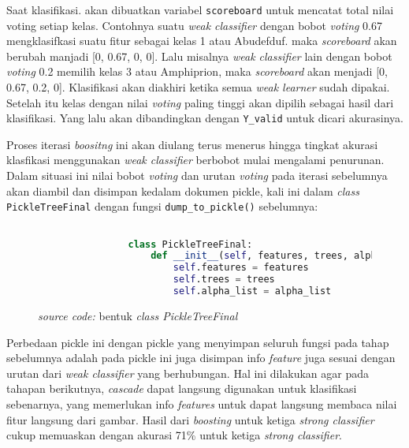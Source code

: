 		Saat klasifikasi. akan dibuatkan variabel \texttt{scoreboard} untuk mencatat total nilai voting 
		setiap kelas. Contohnya suatu \emph{weak classifier} dengan bobot \textit{voting} 0.67 
		mengklasifkasi suatu fitur sebagai kelas 1 atau Abudefduf. maka \emph{scoreboard} akan 
		berubah manjadi [0, 0.67, 0, 0]. Lalu misalnya \emph{weak classifier} lain dengan bobot 
		\textit{voting} 0.2 memilih kelas 3 atau Amphiprion, maka \emph{scoreboard} akan menjadi 
		[0, 0.67, 0.2, 0]. Klasifikasi akan diakhiri ketika semua \emph{weak learner} sudah 
		dipakai. Setelah itu kelas dengan nilai \textit{voting} paling tinggi akan dipilih sebagai 
		hasil dari klasifikasi. Yang lalu akan dibandingkan dengan \texttt{Y\_valid} untuk dicari akurasinya.

		Proses iterasi \emph{boositng} ini akan diulang terus menerus hingga tingkat akurasi klasfikasi 
		menggunakan \emph{weak classifier} berbobot mulai mengalami penurunan. Dalam situasi ini 
		nilai bobot \textit{voting} dan urutan \textit{voting} pada iterasi sebelumnya akan diambil dan disimpan 
		kedalam dokumen pickle, kali ini dalam \textit{class} \texttt{PickleTreeFinal} dengan fungsi 
		\texttt{dump\_to\_pickle()} sebelumnya:

		\begin{figure}[H]
			\begin{lstlisting}[language=Python, basicstyle=\tiny]

				class PickleTreeFinal:
					def __init__(self, features, trees, alpha_list):
						self.features = features
						self.trees = trees
						self.alpha_list = alpha_list

			\end{lstlisting}
			\caption{\emph{source code:} bentuk \textit{class PickleTreeFinal}}
			\label{code: PickleTreeFinal class}
		\end{figure}

		Perbedaan pickle ini dengan pickle yang menyimpan seluruh fungsi pada tahap sebelumnya 
		adalah pada pickle ini juga disimpan info \emph{feature} juga sesuai dengan urutan dari 
		\emph{weak classifier} yang berhubungan. Hal ini dilakukan agar pada tahapan berikutnya, 
		\emph{cascade} dapat langsung digunakan untuk klasifikasi sebenarnya, yang memerlukan info 
		\emph{features} untuk dapat langsung membaca nilai fitur langsung dari gambar. Hasil dari \emph{boosting} untuk ketiga \emph{strong classifier} cukup memuaskan 
		dengan akurasi 71\% untuk ketiga \emph{strong classifier}.
		

